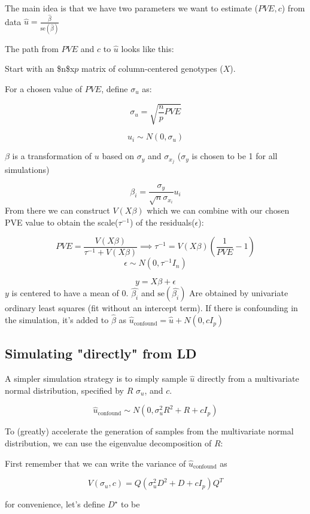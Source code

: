 The main idea is that we have two parameters we want to estimate (\(PVE,c\)) from data \(\hat{u}=\frac{\hat{\beta}}{\text{se}(\hat{\beta})}\)

The path from \(PVE\) and \(c\)  to \(\hat{u}\) looks like this:

Start with an \$n\$x\(p\) matrix of column-centered genotypes (\(X\)).

For a chosen value of \(PVE\), define \(\sigma_u\) as:

$$\sigma_u=\sqrt{\frac{n}{p}PVE}$$

$$u_i \sim N(0,\sigma_u)$$

\(\beta\) is a transformation of \(u\) based on \(\sigma_y\) and \(\sigma_{x_j}\) (\(\sigma_y\) is chosen to be 1 for all simulations)


$$\beta_i=\frac{\sigma_y}{\sqrt{n}\sigma_{x_i}} u_i$$
From there we can construct \(V(X\beta)\) which we can combine with our chosen PVE value to obtain the scale(\(\tau^{-1}\)) of the residuals(\(\epsilon\)):

$$ PVE= \frac{V(X\beta)}{\tau^{-1} + V(X\beta)} \implies \tau^{-1} = V(X\beta) \left(\frac{1}{PVE}-1\right)  $$
$$\epsilon \sim N(0,\tau^{-1}I_n)$$


$$ y= X \beta + \epsilon $$
\(y\) is centered to have a mean of \(0\). \(\hat{\beta_i}\) and \(\text{se}(\hat{\beta_i})\) Are obtained by univariate ordinary least squares (fit without an intercept term). If there is confounding in the simulation, it's added to \(\hat{\beta}\) as \(\hat{u}_{\text{confound}}=\hat{u}+N(0,c I_p)\)


\subsection{Simulating "directly" from LD}\label{sec:org40b8379}

A simpler simulation strategy is to simply sample \(\hat{u}\) directly from a multivariate normal distribution, specified by \(R\) \(\sigma_u\), and \(c\).


$$\hat{u}_{\text{confound}} \sim N(0,\sigma_u^2R^2+R+c I_p)$$

To (greatly) accelerate the generation of samples from the multivariate normal distribution, we can use the eigenvalue decomposition of \(R\):

First remember that we can write the variance of \(\hat{u}_{\text{confound}}\) as 

$$V(\sigma_u,c)=Q(\sigma^2_uD^2+D+c I_p)Q^{T}$$

for convenience, let's define \(D^\star\) to be 

